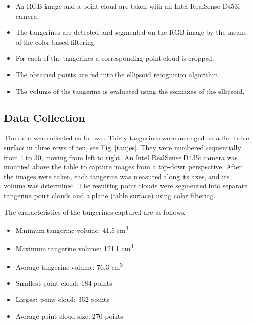 \begin{itemize}
    \item An RGB image and a point cloud are taken with an Intel RealSense D453i camera.
    \item The tangerines are detected and segmented on the RGB image by the means of the color-based filtering.
    \item For each of the tangerines a corresponding point cloud is cropped.
    \item The obtained points are fed into the ellipsoid recognition algorithm.
    \item The volume of the tangerine is evaluated using the semiaxes of the ellipsoid.
\end{itemize}

\subsection{Data Collection}

The data was collected as follows.
Thirty tangerines were arranged on a flat table surface in three rows of ten, see Fig. \ref{tanjes}.
They were numbered sequentially from 1 to 30, moving from left to right. An Intel RealSense D435i camera was mounted above the table to capture images from a top-down perspective.
After the images were taken, each tangerine was measured along its axes, and its volume was determined.
The resulting point clouds were segmented into separate tangerine point clouds and a plane (table surface) using color filtering.

The characteristics of the tangerines captured are as follows.

\begin{itemize}
    \item Minimum tangerine volume: 41.5 \si{cm^3}
    \item Maximum tangerine volume: 121.1 \si{cm^3}
    \item Average tangerine volume: 76.3 \si{cm^3}
    \item Smallest point cloud: 184 points  
    \item Largest point cloud: 352 points  
    \item Average point cloud size: 270 points  
\end{itemize}

